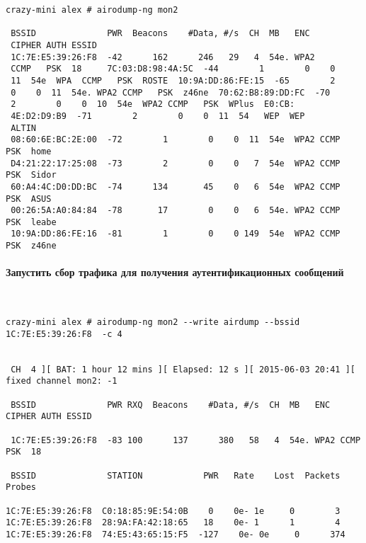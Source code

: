 \documentclass{article}
\begin{document}
\begin{verbatim}
crazy-mini alex # airodump-ng mon2

 BSSID              PWR  Beacons    #Data, #/s  CH  MB   ENC  
 CIPHER AUTH ESSID                                                                                  
 1C:7E:E5:39:26:F8  -42      162      246   29   4  54e. WPA2 
 CCMP   PSK  18     7C:03:D8:98:4A:5C  -44        1        0    0  
 11  54e  WPA  CCMP   PSK  ROSTE  10:9A:DD:86:FE:15  -65        2        
 0    0  11  54e. WPA2 CCMP   PSK  z46ne  70:62:B8:89:DD:FC  -70        
 2        0    0  10  54e  WPA2 CCMP   PSK  WPlus  E0:CB:
 4E:D2:D9:B9  -71        2        0    0  11  54   WEP  WEP         
 ALTIN 
 08:60:6E:BC:2E:00  -72        1        0    0  11  54e  WPA2 CCMP   PSK  home  
 D4:21:22:17:25:08  -73        2        0    0   7  54e  WPA2 CCMP   PSK  Sidor 
 60:A4:4C:D0:DD:BC  -74      134       45    0   6  54e  WPA2 CCMP   PSK  ASUS  
 00:26:5A:A0:84:84  -78       17        0    0   6  54e. WPA2 CCMP   PSK  leabe 
 10:9A:DD:86:FE:16  -81        1        0    0 149  54e  WPA2 CCMP   PSK  z46ne  
\end{verbatim}
\paragraph{Запустить сбор трафика для получения аутентификационных сообщений}
~

\begin{verbatim}
crazy-mini alex # airodump-ng mon2 --write airdump --bssid 1C:7E:E5:39:26:F8  -c 4


 CH  4 ][ BAT: 1 hour 12 mins ][ Elapsed: 12 s ][ 2015-06-03 20:41 ][ fixed channel mon2: -1    
                                                                                                
 BSSID              PWR RXQ  Beacons    #Data, #/s  CH  MB   ENC  CIPHER AUTH ESSID             
                                                                                                
 1C:7E:E5:39:26:F8  -83 100      137      380   58   4  54e. WPA2 CCMP   PSK  18                 
                                                                                                
 BSSID              STATION            PWR   Rate    Lost  Packets  Probes                      
                                                                                                
1C:7E:E5:39:26:F8  C0:18:85:9E:54:0B    0    0e- 1e     0        3                              
1C:7E:E5:39:26:F8  28:9A:FA:42:18:65   18    0e- 1      1        4                               
1C:7E:E5:39:26:F8  74:E5:43:65:15:F5  -127    0e- 0e     0      374   
\end{verbatim}
\end{document}
